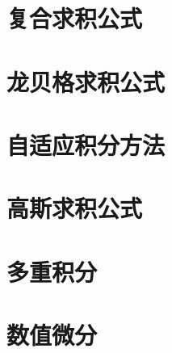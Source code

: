 \section{复合求积公式}
\section{龙贝格求积公式}
\section{自适应积分方法}
\section{高斯求积公式}
\section{多重积分}
\section{数值微分}
